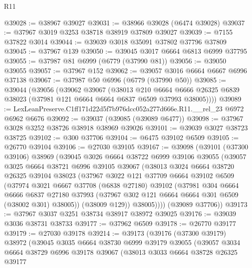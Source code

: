 \begin{lexlean}{R11}
\begin{coremodule}
@39028 := @38967 @39027
@39031 := @38966 @39028 (@6474 @39028)
@39037 := @37967 @3019 @3253 @38718 @38919 @37809 @39027
@39039 := @7155 @37822 @3014
@39044 := @39039 @3018 @35091 @37802 @37796 @37809
@39045 := @37967 @139
@39050 := @39045 @3017 @6664 @6813 @6999 @37795
@39055 := @37987 @81 @6999 (@6779 (@37990 @81))
@39056 := @39050 @39055
@39057 := @37967 @152
@39062 := @39057 @3016 @6664 @6667 @6996 @37138
@39067 := @37987 @50 @6996 (@6779 (@37990 @50))
@39085 := @39044
    (@39056
      (@39062
        @39067
        (@38013
          @210
          @6664
          @6666
          @26325
          @6839
          @38023
          (@37981 @121 @6664 @6664 @6837 @6509 @37993 @38005))))
@39089 := LexLeanPreserve.C1ff171d22d5f7b976dcc052a277d666e.R11.__rel_23 @6972 @6962 @6676
@39092 := @39037 (@39085 (@39089 @6477))
@39098 := @37967 @3028 @3252 @38726 @38918 @38969 @39026
@39101 := @39039 @3027 @38723 @38725
@39102 := @300 @37706
@39104 := @6475 @39102 @6509
@39105 := @26770 @39104
@39106 := @27030 @39105
@39167 := @39098
    (@39101
      (@37300 @39106)
      @38969
      (@39045
        @3026
        @6664
        @38722
        @6999
        @39106
        @39055
        (@39057
          @3025
          @6664
          @38721
          @6996
          @39105
          @39067
          (@38013
            @3024
            @6664
            @38720
            @26325
            @39104
            @38023
            (@37967
              @3022
              @121
              @37709
              @6664
              @39102
              @6509
              (@37974
                @3021
                @6667
                @37708
                (@6838 @27180)
                @39102
                (@37981
                  @304
                  @6664
                  @6666
                  @6837
                  @27180
                  @37993
                  (@37967 @302 @121 @6664 @6664 @301 @6509 (@38002 @301) @38005))
                (@38009 @129))
              @38005))))
      (@39089 @37706))
@39173 := @37967 @3037 @3251 @38734 @38917 @38972 @39025
@39176 := @39039 @3036 @38731 @38733
@39177 := @37962 @6509
@39178 := @26770 @39177
@39179 := @27030 @39178
@39214 := @39173
    (@39176
      (@37300 @39179)
      @38972
      (@39045
        @3035
        @6664
        @38730
        @6999
        @39179
        @39055
        (@39057
          @3034
          @6664
          @38729
          @6996
          @39178
          @39067
          (@38013
            @3033
            @6664
            @38728
            @26325
            @39177

\end{coremodule}
\end{lexlean}
